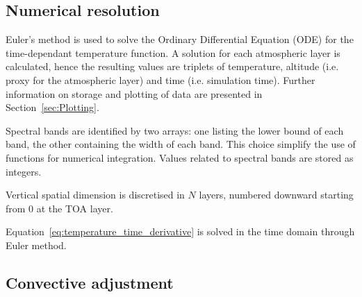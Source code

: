 \documentclass[a4paper,10pt,twocolumn,\classoptions]{article}
\begin{document}




\subsection{Numerical resolution}
\label{sec:Numerical resolution}

Euler's method is used to solve the Ordinary Differential Equation (ODE) for the time-dependant temperature function.
A solution for each atmospheric layer is calculated, hence the resulting values are triplets of temperature, altitude (i.e. proxy for the atmospheric layer) and time (i.e. simulation time). Further information on storage and plotting of data are presented in Section~\ref{sec:Plotting}.

Spectral bands are identified by two arrays: one listing the lower bound of each band, the other containing the width of each band. This choice simplify the use of functions for numerical integration. Values related to spectral bands are stored as integers.

Vertical spatial dimension is discretised in $N$ layers, numbered downward starting from 0 at the TOA layer.

Equation~\eqref{eq:temperature_time_derivative} is solved in the time domain through Euler method. %




\subsection{Convective adjustment}
\label{sec:Convective adjustment}
\end{document}
